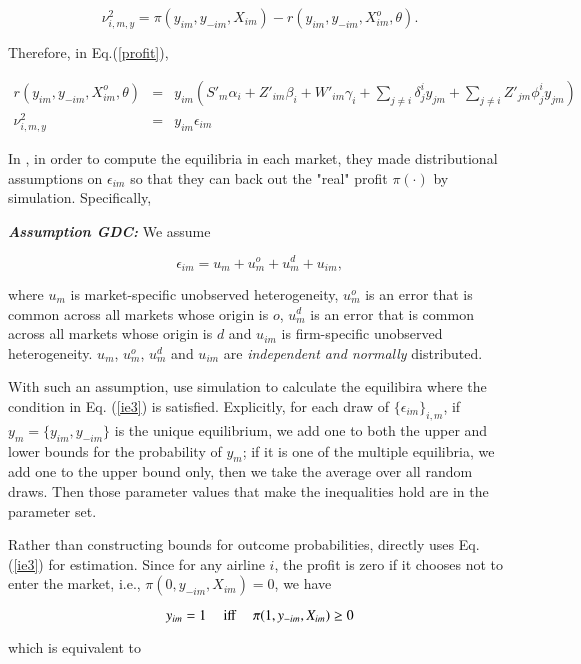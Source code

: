 \documentclass[a4paper]{article}
\begin{document}
\begin{equation}
\nu^2_{i,m,y}=\pi(y_{im},y_{-im},X_{im})-r(y_{im},y_{-im},X^o_{im},\theta).
\end{equation}

Therefore, in Eq.(\ref{profit}),

\begin{eqnarray}
r(y_{im},y_{-im},X^o_{im},\theta)&=&y_{im}(S'_m\alpha_i+Z'_{im}\beta_i+W'_{im}\gamma_i+\sum_{j\neq i}\delta_{j}^i y_{jm}+\sum_{j\neq i}Z'_{jm}\phi_j^iy_{jm})\\
\nu^2_{i,m,y}&=&y_{im}\epsilon_{im}
\end{eqnarray}


In \cite{ciliberto2009market}, in order to compute the equilibria in each market, they made distributional assumptions on $\epsilon_{im}$ so that they can back out the "real" profit $\pi(\cdot)$ by simulation. Specifically,

\bigskip
\textbf{\textit{Assumption GDC:}} We assume

$$\epsilon_{im}=u_{m}+u^o_{m}+u^d_{m}+u_{im},$$

where $u_m$ is market-specific unobserved heterogeneity, $u^o_m$ is an error that is common across all markets whose origin is $o$, $u^d_m$ is an error that is common across all markets whose origin is $d$ and $u_{im}$ is firm-specific unobserved heterogeneity. $u_m$, $u^o_m$, $u^d_m$ and $u_{im}$ are \textit{independent and normally} distributed.
\bigskip


With such an assumption, \cite{ciliberto2009market} use simulation to calculate the equilibira where the condition in Eq. (\ref{ie3}) is satisfied. Explicitly, for each draw of $\{\epsilon_{im}\}_{i,m}$, if $y_m=\{y_{im}, y_{-im}\}$ is the unique equilibrium, we add one to both the upper and lower bounds for the probability of $y_m$; if it is one of the multiple equilibria, we add one to the upper bound only, then we take the average over all random draws. Then those parameter values that make the inequalities hold are in the parameter set. 


Rather than constructing bounds for outcome probabilities, \cite{pakes2015moment} directly uses Eq.(\ref{ie3}) for estimation. Since for any airline $i$, the profit is zero if it chooses not to enter the market, i.e., $\pi(0,y_{-im},X_{im})=0$, we have


$$y_{im}=1 \mbox{ \quad iff \quad }  \pi(1,y_{-im},X_{im}) \geq 0$$


which is equivalent to 
\end{document}
